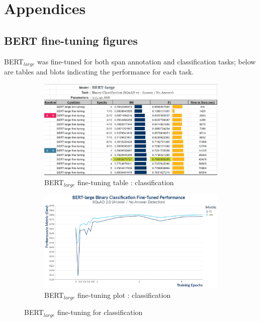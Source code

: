 \appendix

\section{Appendices}
\label{sec:appendix}
\small

\subsection{BERT fine-tuning figures}

BERT$_{large}$ was fine-tuned for both span annotation and classification tasks; below are tables and blots indicating the performance for each task.

\begin{figure}[h]
	\centering
	\begin{subfigure}{0.95\textwidth}%
		\centering
		\includegraphics[width=\linewidth]{images/classification/BERT_Large_Training.png}%
		\caption{BERT$_{large}$ fine-tuning table : classification}
	\end{subfigure}%

	\vspace*{8pt}%
	
	\begin{subfigure}{0.96\textwidth}%
		\centering
		\includegraphics[width=\linewidth]{images/BinaryClassification_BERT_Training_Performance_plot.png}%
		\caption{BERT$_{large}$ fine-tuning plot : classification}
	\end{subfigure}%
	\caption{\label{apdx:BERT_fine_tuning_classification}BERT$_{large}$ fine-tuning for classification}
\end{figure}%

